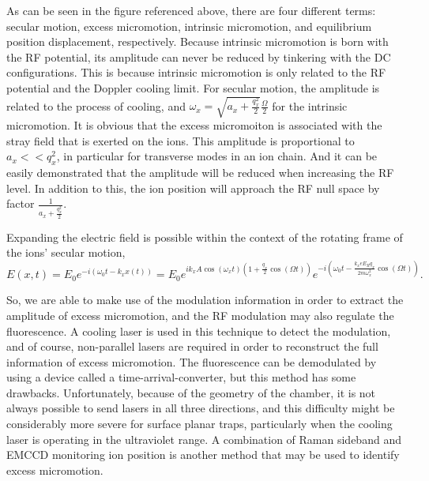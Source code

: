 As can be seen in the figure referenced above, there are four different terms: secular motion, excess micromotion, intrinsic micromotion, and equilibrium position displacement, respectively. Because intrinsic micromotion is born with the RF potential, its amplitude can never be reduced by tinkering with the DC configurations. This is because intrinsic micromotion is only related to the RF potential and the Doppler cooling limit. For secular motion, the amplitude is related to the process of cooling, and \(\omega_x=\sqrt{a_x+\frac{q_x^2}{2}}\frac{\Omega}{2}\) for the intrinsic micromotion. It is obvious that the excess micromoiton is associated with the stray field that is exerted on the ions. This amplitude is proportional to \(a_x<<q_x^2\), in particular for transverse modes in an ion chain. And it can be easily demonstrated that the amplitude will be reduced when increasing the RF level. In addition to this, the ion position will approach the RF null space by factor \(\frac{1}{a_x+\frac{q_x^2}{2}}\).

Expanding the electric field is possible within the context of the rotating frame of the ions' secular motion,
\begin{equation}
    E(x, t)=E_0 e^{-i\left(\omega_0 t-k_x x(t)\right)}=E_0 e^{i k_x A \cos \left(\omega_x t\right)\left(1+\frac{q_x}{2} \cos (\Omega t)\right)} e^{-i\left(\omega_0 t-\frac{k_x e E_R q_x}{2 m \omega_x^2} \cos (\Omega t)\right)}.
\end{equation}

So, we are able to make use of the modulation information in order to extract the amplitude of excess micromotion, and the RF modulation may also regulate the fluorescence. A cooling laser is used in this technique to detect the modulation, and of course, non-parallel lasers are required in order to reconstruct the full information of excess micromotion. The fluorescence can be demodulated by using a device called a time-arrival-converter, but this method has some drawbacks. Unfortunately, because of the geometry of the chamber, it is not always possible to send lasers in all three directions, and this difficulty might be considerably more severe for surface planar traps, particularly when the cooling laser is operating in the ultraviolet range. A combination of Raman sideband and EMCCD monitoring ion position is another method that may be used to identify excess micromotion.

